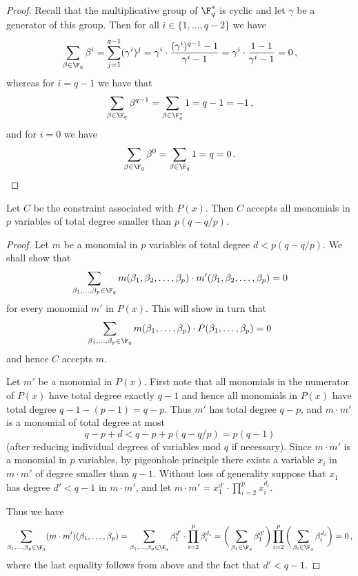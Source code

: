 \begin{proof}
Recall that the multiplicative group of $\F_q^*$ is cyclic and let $\gamma$ be a generator of this group. Then for all $i \in \{1,\ldots,q-2\}$ we have
$$\sum_{\beta \in \F_q} \beta^i = \sum_{j=1}^{q-1} (\gamma^i)^j = \gamma^i \cdot \frac {(\gamma^i)^{q-1} - 1} {\gamma^i -1} =  \gamma^i \cdot \frac {1- 1} {\gamma^i -1} =0\,, $$
whereas for $i = q-1$ we have that
\[\sum_{\beta \in \F_q} \beta^{q-1} = \sum_{\beta \in \F_q^*} 1 = q-1 = -1\,,\]
and for $i=0$ we have
\[\sum_{\beta \in \F_q} \beta^{0} = \sum_{\beta \in \F_q} 1 = q = 0\,.\qedhere\]
\end{proof}

\begin{lemma}\label{lem:tech-lem-accept}
Let $C$ be the constraint associated with $P(x)$. Then $C$ accepts all monomials in $p$ variables of total degree smaller than $p(q-q/p)$.
\end{lemma}

\begin{proof}
Let $m$ be a monomial in $p$ variables of total degree $d < p (q-q/p)$. We shall show that $$\sum_{\beta_1,\ldots, \beta_p \in \F_q} m(\beta_1,\beta_2,\ldots,\beta_p)  \cdot m'(\beta_1,\beta_2,\ldots, \beta_p)=0 $$ for every monomial $m'$ in $P(x)$. This will show in turn that $$\sum_{\beta_1,\ldots,\beta_p \in \F_q} m(\beta_1,\ldots,\beta_p) \cdot P(\beta_1,\ldots,\beta_p) =0$$ and hence $C$ accepts $m$.

Let $m'$ be a monomial in $P(x)$. First note that all monomials in the numerator of $P(x)$ have total degree exactly $q-1$ and hence all monomials
in $P(x)$ have total degree $q-1-(p-1)=q-p$. Thus $m'$ has total degree $q-p$, and $m \cdot m'$ is a monomial of total degree at most
$$q-p +d <
q-p + p(q-q/p) = p(q-1)$$ (after reducing individual degrees of variables mod $q$ if necessary).  Since $m \cdot m'$ is a monomial in $p$ variables, by pigeonhole principle there exists a variable $x_i$ in $m \cdot m'$ of degree smaller than $q-1$. Without loss of generality suppose that $x_1$ has degree $d' < q-1$ in $m \cdot m'$, and let $m \cdot m' = x_1^{d'} \cdot
\prod_{i=2}^{p} x_i^{d_i}$.

Thus we have
%
%
\begin{equation*}
 \sum_{\beta_1,\ldots,\beta_p \in \F_q} (m \cdot m') (\beta_1,\ldots,\beta_p)   = 
 \sum_{\beta_1,\ldots,\beta_p \in \F_q}  \beta_1^{d'} \cdot  \prod_{i=2}^{p} \beta_i^{d_i}  
 =  \bigg(\sum_{\beta_1 \in \F_q} \beta_1^{d'}\bigg) \prod_{i=2}^p \bigg( \sum_{\beta_i \in \F_q} \beta_i^{d_i}\bigg)
  =  0\,,
  \end{equation*}
%
%
where the last equality follows from  above and the fact that $d' <q-1$.
\end{proof}

